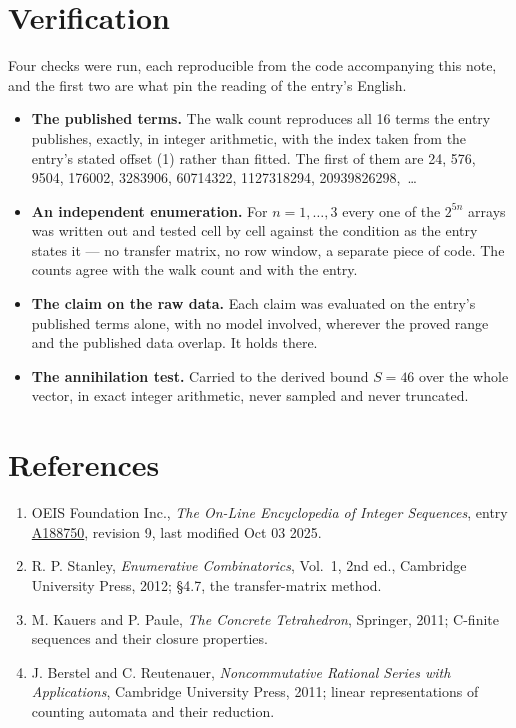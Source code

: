 \documentclass[11pt]{article}
\theoremstyle{definition}
\begin{document}
\section{Verification}

Four checks were run, each reproducible from the code accompanying this note, and the first two are what pin the reading of the entry's English.

\begin{itemize}

\item {\bfseries The published terms.} The walk count reproduces all 16 terms the entry publishes, exactly, in integer arithmetic, with the index taken from the entry's stated offset (1) rather than fitted. The first of them are 24, 576, 9504, 176002, 3283906, 60714322, 1127318294, 20939826298,~\dots

\item {\bfseries An independent enumeration.} For $n = 1,\dots,3$ every one of the $2^{5n}$ arrays was written out and tested cell by cell against the condition as the entry states it --- no transfer matrix, no row window, a separate piece of code. The counts agree with the walk count and with the entry.

\item {\bfseries The claim on the raw data.} Each claim was evaluated on the entry's published terms alone, with no model involved, wherever the proved range and the published data overlap. It holds there.

\item {\bfseries The annihilation test.} Carried to the derived bound $S = 46$ over the whole vector, in exact integer arithmetic, never sampled and never truncated.

\end{itemize}

\section{References}

\begin{enumerate}

\item OEIS Foundation Inc., \emph{The On-Line Encyclopedia of Integer Sequences}, entry \href{https://oeis.org/A188750}{A188750}, revision 9, last modified Oct 03 2025.

\item R. P. Stanley, \emph{Enumerative Combinatorics}, Vol.~1, 2nd ed., Cambridge University Press, 2012; \S4.7, the transfer-matrix method.

\item M. Kauers and P. Paule, \emph{The Concrete Tetrahedron}, Springer, 2011; C-finite sequences and their closure properties.

\item J. Berstel and C. Reutenauer, \emph{Noncommutative Rational Series with Applications}, Cambridge University Press, 2011; linear representations of counting automata and their reduction.

\end{enumerate}
\end{document}
